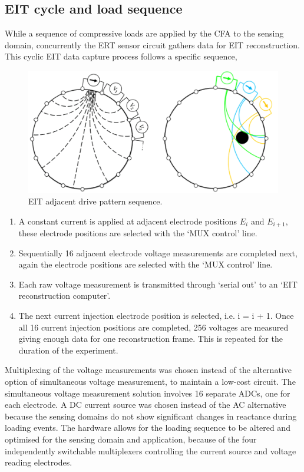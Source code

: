 \subsection{EIT cycle and load sequence}
While a sequence of compressive loads are applied by the CFA to the sensing domain, concurrently the ERT sensor circuit gathers data for EIT reconstruction. This cyclic EIT data capture process follows a specific sequence, 
\begin{figure}[H]
\centering
\includegraphics[width=0.8\linewidth]{Figures/eit_sequence.png}
\caption{EIT adjacent drive pattern sequence.}
\label{fig:EIT_adj_drive}
\end{figure}
\begin{enumerate}
\item A constant current is applied at adjacent electrode positions $E_i$ and $E_{i+1}$, these electrode positions are selected with the `MUX control' line.
\item Sequentially 16 adjacent electrode voltage measurements are completed next, again the electrode positions are selected with the `MUX control' line.
\item Each raw voltage measurement is transmitted through `serial out' to an `EIT reconstruction computer'.
\item The next current injection electrode position is selected, i.e. i = i + 1. Once all 16 current injection positions are completed, 256 voltages are measured giving enough data for one reconstruction frame. This is repeated for the duration of the experiment.
\end{enumerate}
Multiplexing of the voltage measurements was chosen instead of the alternative option of simultaneous voltage measurement, to maintain a low-cost circuit. The simultaneous voltage measurement solution involves 16 separate ADCs, one for each electrode. A DC current source was chosen instead of the AC alternative because the sensing domains do not show significant changes in reactance during loading events. The hardware allows for the loading sequence to be altered and optimised for the sensing domain and application, because of the four independently switchable multiplexers controlling the current source and voltage reading electrodes.


